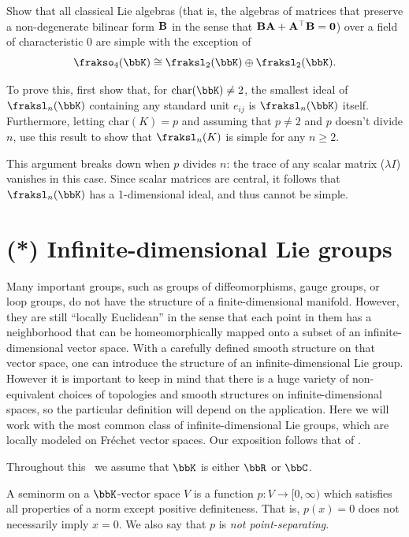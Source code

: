 \begin{xca}
    Show that all classical Lie algebras (that is, the algebras of matrices that preserve a non-degenerate bilinear form $\bf{B}$ in the sense that $\bf{B}A+A^\top \bf{B}=0$) over a field of characteristic 0 are simple with the exception of
    \[\frakso_4(\bbK)\cong \fraksl_2(\bbK)\oplus\fraksl_2(\bbK).\]

    To prove this, first show that, for $\mathrm{char}(\bbK)\neq 2$, the smallest ideal of $\fraksl_n(\bbK)$ containing any standard unit $e_{ij}$ is $\fraksl_n(\bbK)$ itself. Furthermore, letting $\mathrm{char}(K)=p$ and assuming that $p\neq 2$ and $p$ doesn't divide $n$, use this result to show that $\fraksl_n(K)$ is simple for any $n\geq 2$. 

    This argument breaks down when $p$ divides $n$: the trace of any scalar matrix ($\lambda I$) vanishes in this case. Since scalar matrices are central, it follows that $\fraksl_n(\bbK)$ has a 1-dimensional ideal, and thus cannot be simple.
\end{xca}






\section{(*) Infinite-dimensional Lie groups}\label{sec: inf-dim groups}


Many important groups, such as groups of diffeomorphisms, gauge groups, or loop groups, do not have the structure of a finite-dimensional manifold. However, they are still ``locally Euclidean'' in the sense that each point in them has a neighborhood that can be homeomorphically mapped onto a subset of an infinite-dimensional vector space. With a carefully defined smooth structure on that vector space, one can introduce the structure of an infinite-dimensional Lie group. However it is important to keep in mind that there is a huge variety of non-equivalent choices of topologies and smooth structures on infinite-dimensional spaces, so the particular definition will depend on the application. Here we will work with the most common class of infinite-dimensional Lie groups, which are locally modeled on Fr\'echet vector spaces. Our exposition follows that of \cite{Neeb}.

Throughout this \sect\  we assume that $\bbK$ is either $\bbR$ or $\bbC$.

\begin{defn}[Seminorm]
    A seminorm on a $\bbK$-vector space $V$ is a function $p:V\to [0,\infty)$ which satisfies all properties of a norm except positive definiteness. That is, $p(x)=0$ does not necessarily imply $x=0$. We also say that $p$ is \emph{not point-separating}.
\end{defn}

